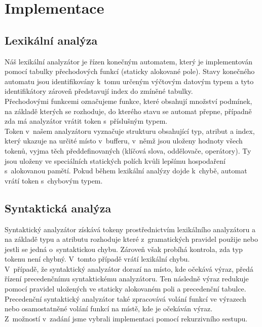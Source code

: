 \documentclass[11pt]{article}
\begin{document}
	\section{Implementace}
	
	\subsection{Lexikální analýza}
    	Náš lexikální analyzátor je řízen konečným automatem, který je implementován pomocí tabulky
    	přechodových funkcí (staticky alokované pole). Stavy konečného automatu jsou identifikovány
    	k~tomu určeným výčtovým datovým typem a tyto identifikátory zároveň představují index do zmíněné tabulky.
    	\\
    	\indent Přechodovými funkcemi označujeme funkce, které obsahují množství podmínek, na základě
    	kterých se rozhoduje, do kterého stavu se automat přepne, případně zda má analyzátor vrátit token
    	s~příslušným typem. \\
     	\indent Token v~našem analyzátoru vyznačuje strukturu obsahující typ, atribut a index, který
     	ukazuje na  určité místo v~bufferu, v~němž jsou uloženy hodnoty všech tokenů, vyjma těch
     	předdefinovaných (klíčová slova, oddělovače, operátory). Ty jsou uloženy ve speciálních
     	statických polích kvůli lepšímu hospodaření s~alokovanou pamětí. Pokud během lexikální analýzy
     	dojde k~chybě, automat vrátí token s~chybovým typem. 

	\subsection{Syntaktická analýza}
	    Syntaktický analyzátor získává tokeny prostřednictvím lexikálního analyzátoru a na základě typu a
	    atributu rozhoduje které z~gramatických pravidel použije nebo jestli se jedná o~syntaktickou chybu.
	    Zároveň však probíhá kontrola, zda typ tokenu není chybný. V~tomto případě vrátí lexikální chybu.
	    \\
	    \indent V~případě, že syntaktický analyzátor dorazí na místo, kde očekává výraz, předá řízení
	    precedenčnímu syntaktickému analyzátoru. Ten následně výraz redukuje pomocí pravidel uložených ve
	    staticky alokovaném poli a precedenční tabulce. Precedenční syntaktický analyzátor také zpracovává volání funkcí ve výrazech nebo osamostatněné volání funkcí na místě, kde je očekáván výraz.\\
	    \indent Z~možností v~zadání jsme vybrali implementaci pomocí rekurzivního sestupu.
	
\end{document}
